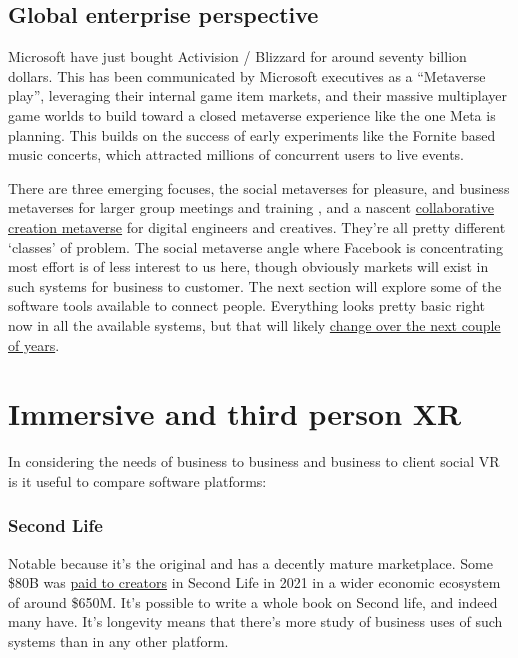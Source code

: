 \subsection{Global enterprise perspective}
Microsoft have just bought Activision / Blizzard for around seventy billion dollars. This has been communicated by Microsoft executives as a ``Metaverse play'', leveraging their internal game item markets, and their massive multiplayer game worlds to build toward a closed metaverse experience like the one Meta is planning.
This builds on the success of early experiments like the Fornite based music concerts, which attracted millions of concurrent users to live events.

There are three emerging focuses, the social metaverses for pleasure, and business metaverses for larger group meetings and training \cite{heiphetz2010training, aldrich2005learning}, and a nascent \href{https://blogs.nvidia.com/blog/2022/01/04/omniverse-available-free-to-creators/}{collaborative creation metaverse} for digital engineers and creatives. They're all pretty different `classes' of problem. The social metaverse angle where Facebook is concentrating most effort is of less interest to us here, though obviously markets will exist in such systems for business to customer. The next section will explore some of the software tools available to connect people. Everything looks pretty basic right now in all the available systems, but that will likely \href{https://www.youtube.com/watch?v=cRLnR4Kot2M}{change over the next couple of years}.

\section{Immersive and third person XR}
In considering the needs of business to business and business to client social VR is it useful to compare software platforms:
\subsubsection{Second Life}
Notable because it's the original and has a decently mature marketplace. Some \$80B was \href{https://www.zdnet.com/article/high-fidelity-invests-in-second-life-to-expand-virtual-world/}{paid to creators} in Second Life in 2021 in a wider economic ecosystem of around \$650M. It's possible to write a whole book on Second life, and indeed many have. It's longevity means that there's more study of business uses of such systems than in any other platform. 
